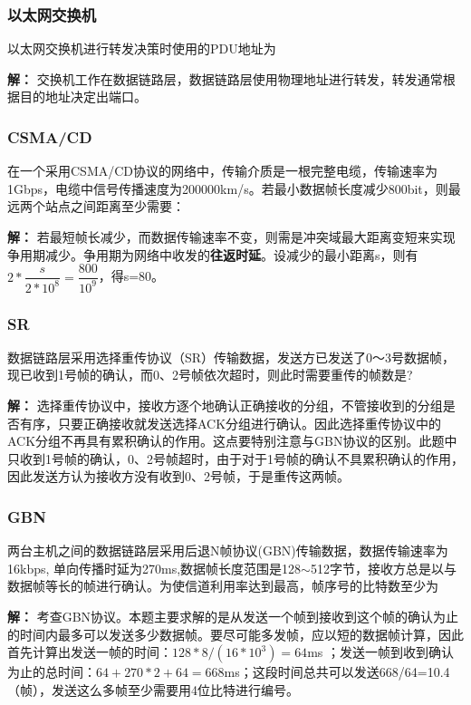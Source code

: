 \subsubsection{以太网交换机}
以太网交换机进行转发决策时使用的PDU地址为

\textbf{解：}
交换机工作在数据链路层，数据链路层使用物理地址进行转发，转发通常根据目的地址决定出端口。


\subsubsection{CSMA/CD}
在一个采用CSMA/CD协议的网络中，传输介质是一根完整电缆，传输速率为1Gbps，电缆中信号传播速度为200000km/s。若最小数据帧长度减少800bit，则最远两个站点之间距离至少需要：

\textbf{解：}
若最短帧长减少，而数据传输速率不变，则需是冲突域最大距离变短来实现争用期减少。争用期为网络中收发的\textbf{往返时延}。设减少的最小距离s，则有\(2 * \dfrac{s}{2 * 10^8} = \dfrac{800}{10^9}\)，得s=80。


\subsubsection{SR}
数据链路层采用选择重传协议（SR）传输数据，发送方已发送了0～3号数据帧，现已收到1号帧的确认，而0、2号帧依次超时，则此时需要重传的帧数是?

\textbf{解：}
选择重传协议中，接收方逐个地确认正确接收的分组，不管接收到的分组是否有序，只要正确接收就发送选择ACK分组进行确认。因此选择重传协议中的ACK分组不再具有累积确认的作用。这点要特别注意与GBN协议的区别。此题中只收到1号帧的确认，0、2号帧超时，由于对于1号帧的确认不具累积确认的作用，因此发送方认为接收方没有收到0、2号帧，于是重传这两帧。


\subsubsection{GBN}
两台主机之间的数据链路层采用后退N帧协议(GBN)传输数据，数据传输速率为
16kbps, 单向传播时延为270ms,数据帧长度范围是128\(\sim\)512字节，接收方总是以与数据帧等长的帧进行确认。为使信道利用率达到最高，帧序号的比特数至少为

\textbf{解：}
考查GBN协议。本题主要求解的是从发送一个帧到接收到这个帧的确认为止的时间内最多可以发送多少数据帧。要尽可能多发帧，应以短的数据帧计算，因此首先计算出发送一帧的时间：\(128 * 8/(16 * 10^3)=64\)ms ；发送一帧到收到确认为止的总时间：\(64+270*2+64=668\)ms；这段时间总共可以发送668/64=10.4（帧），发送这么多帧至少需要用4位比特进行编号。


